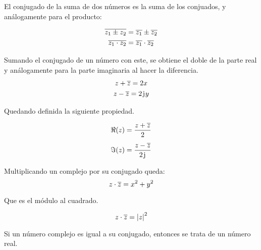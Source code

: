 El conjugado de la suma de dos números es la suma de los conjuados, y análogamente para el producto:

\begin{mdframed}[style=PropertyFrame]
    \begin{prop}
        \label{prop:zw*=(z*w)*}
    \end{prop}
    \begin{gather*}
        \overline{z_1 \pm z_2} = \overline{z_1} \pm \overline{z_2}
        \\
        \overline{z_1 \cdot z_2} = \overline{z_1} \cdot \overline{z_2}
    \end{gather*}
\end{mdframed}

Sumando el conjugado de un número con este, se obtiene el doble de la parte real y análogamente para la parte imaginaria al hacer la diferencia.
\begin{gather*}
        z+\overline{z} = 2x
        \\
        z-\overline{z} = 2 \mkern2mu\mathrm{j}\mkern1mu y
    \end{gather*}

Quedando definida la siguiente propiedad.

\begin{mdframed}[style=PropertyFrame]
    \begin{prop}
        \label{prop:ReIm}
    \end{prop}
    \begin{align*}
        \Re (z) &= \frac{z+\overline{z}}{2}
        \\[1ex]
        \Im (z) &= \frac{z-\overline{z}}{2 \mkern2mu\mathrm{j}\mkern1mu}
    \end{align*}
\end{mdframed}

Multiplicando un complejo por su conjugado queda:
\begin{equation*}
    z \cdot \overline{z} = x^2+y^2
\end{equation*}

Que es el módulo al cuadrado.

\begin{mdframed}[style=PropertyFrame]
    \begin{prop}
        \label{prop:|z|^2=z.z*}
    \end{prop}
    \begin{equation*}
        z \cdot \overline{z} = {\left| {z} \right|}^2
    \end{equation*}
\end{mdframed}

Si un número complejo es igual a su conjugado, entonces se trata de un número real.

